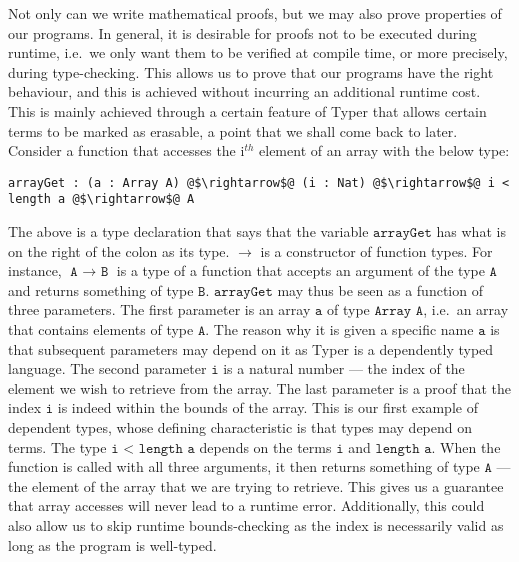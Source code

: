 \documentclass[12pt,twoside,maitrise]{dms}
\theoremstyle{definition}
\numberwithin{equation}{section}
\numberwithin{table}{chapter}
\numberwithin{figure}{chapter}
\newcommand\id[1] {\texttt{#1}}
\newcommand\fn[1] {\texttt{#1}}
\begin{document}

Not only can we write mathematical proofs, but we may also prove properties of
our programs. In general, it is desirable for proofs not to be executed during
runtime, i.e.\ we only want them to be verified at compile time, or more
precisely, during type-checking. This allows us to prove that our programs have
the right behaviour, and this is achieved without incurring an additional runtime
cost. This is mainly achieved through a certain feature of Typer that allows
certain terms to be marked as erasable, a point that we shall come back to
later. Consider a function that accesses the i$^{th}$ element of an array with the
below type:

\begin{verbatim}
arrayGet : (a : Array A) @$\rightarrow$@ (i : Nat) @$\rightarrow$@ i < length a @$\rightarrow$@ A
\end{verbatim}

The above is a type declaration that says that the variable $\fn{arrayGet}$ has
what is on the right of the colon as its type. $\rightarrow$ is a constructor of
function types. For instance, $\fn{A $\rightarrow$ B}$ is a type of a function
that accepts an argument of the type $\fn{A}$ and returns something of type
$\fn{B}$. $\fn{arrayGet}$ may thus be seen as a function of three parameters.
The first parameter is an array $\fn{a}$ of type $\fn{Array A}$, i.e.\ an array
that contains elements of type $\fn{A}$. The reason why it is given a specific
name $\fn{a}$ is that subsequent parameters may depend on it as Typer is a
dependently typed language. The second parameter $\fn{i}$ is a natural number
--- the index of the element we wish to retrieve from the array. The last
parameter is a proof that the index $\id{i}$ is indeed within the bounds of the
array. This is our first example of dependent types, whose defining
characteristic is that types may depend on terms. The type $\fn{i < length a}$
depends on the terms $\fn{i}$ and $\fn{length a}$. When the function is called
with all three arguments, it then returns something of type $\fn{A}$ --- the
element of the array that we are trying to retrieve. This gives us a guarantee
that array accesses will never lead to a runtime error. Additionally, this could
also allow us to skip runtime bounds-checking as the index is necessarily valid
as long as the program is well-typed.
\end{document}
